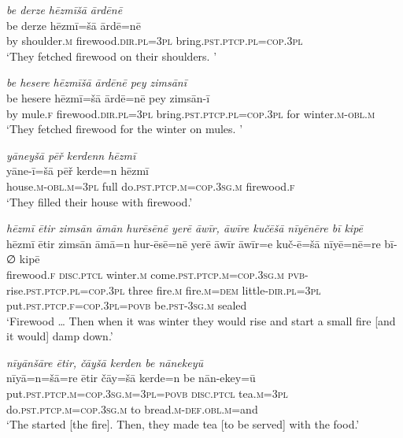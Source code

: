 \ea \label{ŽE.34}
\textit{be derze hēzmīšā ārdēnē} \\ 
\gll be derze hēzmī=šā ārdē=nē \\ 
 by shoulder\textsc{.m} firewood\textsc{.dir}\textsc{.pl}\textsc{=3pl} bring\textsc{.pst}\textsc{.ptcp}\textsc{.pl}\textsc{=cop}\textsc{.3pl} \\ 
\glt `They fetched firewood on their shoulders. '
\z 
 
\ea \label{ŽE.35}
\textit{be hesere hēzmīšā ārdēnē pey zimsānī} \\ 
\gll be hesere hēzmī=šā ārdē=nē pey zimsān-ī \\ 
 by mule\textsc{.f} firewood\textsc{.dir}\textsc{.pl}\textsc{=3pl} bring\textsc{.pst}\textsc{.ptcp}\textsc{.pl}\textsc{=cop}\textsc{.3pl} for winter\textsc{.m}\textsc{-obl}\textsc{.m} \\ 
\glt `They fetched firewood for the winter on mules. '
\z 
 
\ea \label{ŽE.36}
\textit{yāneyšā pēř kerdenn hēzmī} \\ 
\gll yāne-ī=šā pēř kerde=n hēzmī \\ 
 house\textsc{.m}\textsc{-obl}\textsc{.m}\textsc{=3pl} full do\textsc{.pst}\textsc{.ptcp}\textsc{.m}\textsc{=cop}\textsc{.3sg}\textsc{.m} firewood\textsc{.f} \\ 
\glt `They filled their house with firewood.'
\z 
 
\ea \label{ŽE.37}
\textit{hēzmī ētir zimsān āmān hurēsēnē yerē āwīr, āwīre kučēšā nīyēnēre bī kipē} \\ 
\gll hēzmī ētir zimsān āmā=n hur-ēsē=nē yerē āwīr āwīr=e kuč-ē=šā nīyē=nē=re bī-∅ kipē \\ 
 firewood\textsc{.f} \textsc{disc}.\textsc{ptcl} winter\textsc{.m} come\textsc{.pst}\textsc{.ptcp}\textsc{.m}\textsc{=cop}\textsc{.3sg}\textsc{.m} \textsc{pvb-}rise\textsc{.pst}\textsc{.ptcp}\textsc{.pl}\textsc{=cop}\textsc{.3pl} three fire\textsc{.m} fire\textsc{.m}\textsc{=dem} little\textsc{-dir}\textsc{.pl}\textsc{=3pl} put\textsc{.pst}\textsc{.ptcp}\textsc{.f}\textsc{=cop}\textsc{.3pl}\textsc{=\textsc{povb}} be\textsc{.pst}\textsc{-3sg}\textsc{.m} sealed \\ 
\glt `Firewood …  Then when it was winter they would rise and start a small fire [and it would] damp down.'
\z 
 
\ea \label{ŽE.38}
\textit{nīyānšāre ētir, čāyšā kerden be nānekeyū} \\ 
\gll nīyā=n=šā=re ētir čāy=šā kerde=n be nān-ekey=ū \\ 
 put\textsc{.pst}\textsc{.ptcp}\textsc{.m}\textsc{=cop}\textsc{.3sg}\textsc{.m}\textsc{=3pl}\textsc{=\textsc{povb}} \textsc{disc}.\textsc{ptcl} tea\textsc{.m}\textsc{=3pl} do\textsc{.pst}\textsc{.ptcp}\textsc{.m}\textsc{=cop}\textsc{.3sg}\textsc{.m} to bread\textsc{.m}\textsc{-def}\textsc{.obl}\textsc{.m}=and \\ 
\glt `The started [the fire].  Then, they made tea [to be served] with the food.'
\z 
 
